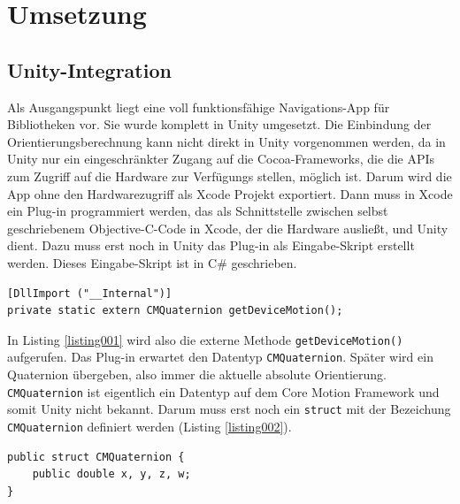 
\chapter{Umsetzung}
  \label{Umsetzung}
  
\section{Unity-Integration}
Als Ausgangspunkt liegt eine voll funktionsfähige Navigations-App für Bibliotheken vor. Sie wurde komplett in Unity umgesetzt. Die Einbindung der Orientierungsberechnung kann nicht direkt in Unity vorgenommen werden, da in Unity nur ein eingeschränkter Zugang auf die Cocoa-Frameworks, die die APIs zum Zugriff auf die Hardware zur Verfügungs stellen, möglich ist. Darum wird die App ohne den Hardwarezugriff als Xcode Projekt exportiert. Dann muss in Xcode ein Plug-in programmiert werden, das als Schnittstelle zwischen selbst geschriebenem Objective-C-Code in Xcode, der die Hardware ausließt, und Unity dient. Dazu muss erst noch in Unity das Plug-in als Eingabe-Skript erstellt werden. Dieses Eingabe-Skript ist in C\# geschrieben.
~\\
\begin{lstlisting}[float=htb, caption=Plug-in in Unity, label=listing001]
[DllImport ("__Internal")]
private static extern CMQuaternion getDeviceMotion();
\end{lstlisting}
  
In Listing \ref{listing001}  wird also die externe Methode \texttt{getDeviceMotion()} aufgerufen. Das Plug-in erwartet den Datentyp \texttt{CMQuaternion}. Später wird ein Quaternion übergeben, also immer die aktuelle absolute Orientierung. \texttt{CMQuaternion} ist eigentlich ein Datentyp auf dem Core Motion Framework und somit Unity nicht bekannt. Darum muss erst noch ein \texttt{struct} mit der Bezeichung \texttt{CMQuaternion} definiert werden (Listing \ref{listing002}).
~\\
\begin{lstlisting}[float=htb, caption=Struct \texttt{CMQuaternion} in C\#, label=listing002]
public struct CMQuaternion {
	public double x, y, z, w;
}
\end{lstlisting}


